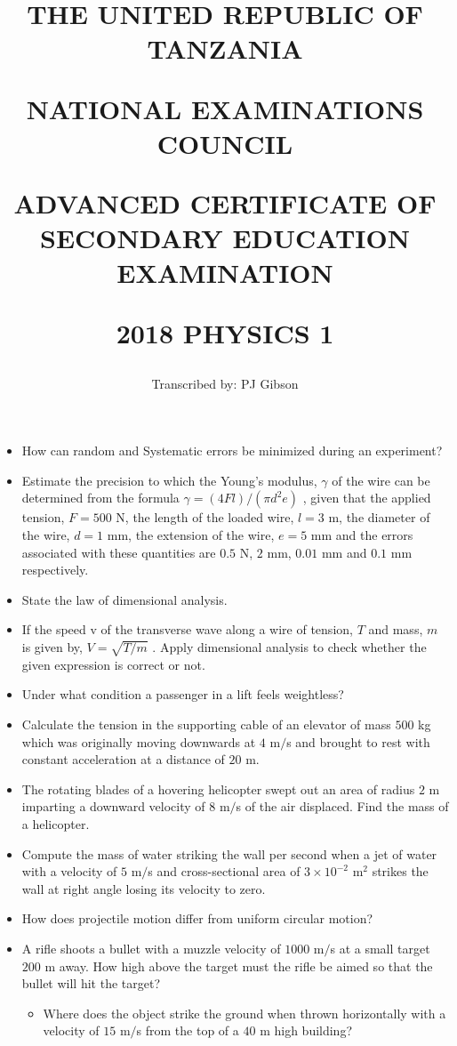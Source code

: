 \documentclass{article}
\title{THE UNITED REPUBLIC OF TANZANIA

NATIONAL EXAMINATIONS COUNCIL

ADVANCED CERTIFICATE OF SECONDARY EDUCATION EXAMINATION

\textbf{2018 PHYSICS 1}}
\author{Transcribed by:  PJ Gibson}
\begin{document}
\maketitle

\begin{itemize}
\item How can random and Systematic errors be minimized during an experiment?
\item Estimate the precision to which the Young’s modulus, $ \gamma $ of the wire can be determined from the formula $ \gamma =(4Fl)/(\pi d^{2} e)$ , given that the applied tension, $ F=500$ N, the length of the loaded wire,  $ l=3$ m, the diameter of the wire, $ d=1$ mm, the extension of the wire, $ e=5$ mm and the errors associated with these quantities are $ 0.5$ N, $ 2$ mm, $ 0.01$ mm and $ 0.1$ mm respectively. 
\item State the law of dimensional analysis. 
\item If the speed v of the transverse wave along a wire of tension, $ T$ and mass, $ m$ is given by, $ V=\sqrt{T/m}$ .  Apply dimensional analysis to check whether the given expression is correct or not.  
\item Under what condition a passenger in a lift feels weightless? 
\item Calculate the tension in the supporting cable of an elevator of mass $ 500$ kg which was originally moving downwards at $ 4$ m$/$s and brought to rest with constant acceleration at a distance of $ 20$ m. 
\item The rotating blades of a hovering helicopter swept out an area of radius $ 2$ m imparting a downward velocity of $ 8$ m$/$s of the air displaced. Find the mass of a helicopter. 
\item Compute the mass of water striking the wall per second when a jet of water with a velocity of $ 5$ m$/$s and cross-sectional area of $ 3 \times 10^{-2}$ m$ ^{2}$ strikes the wall at right angle losing its velocity to zero. 
\item How does projectile motion differ from uniform circular motion? 
\item A rifle shoots a bullet with a muzzle velocity of $ 1000$ m$/$s at a small target $ 200$ m away. How high above the target must the rifle be aimed so that the bullet will hit the target? 
 \begin{itemize}
\item Where does the object strike the ground when thrown horizontally with a velocity of $ 15$ m$/$s from the top of a $ 40$ m high building? 

\end{itemize}
\end{itemize}
\end{document}
